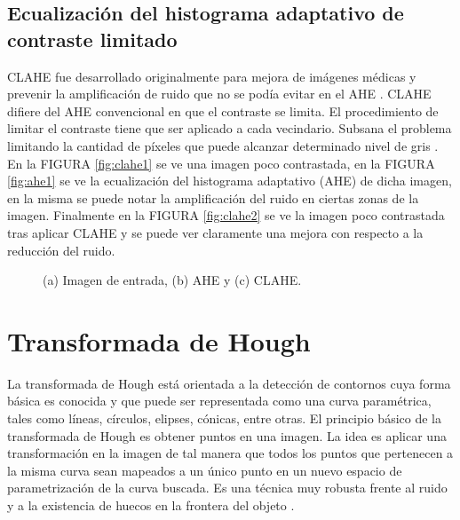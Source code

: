 \subsection{Ecualización del histograma adaptativo de contraste limitado}
CLAHE fue desarrollado originalmente para mejora de imágenes médicas y prevenir la amplificación de ruido que no se podía evitar en el AHE \cite{pizer1987adaptive}.
CLAHE difiere del AHE convencional en que el contraste se limita. El procedimiento de limitar el contraste tiene que ser aplicado a cada vecindario. Subsana el problema limitando la cantidad de píxeles que puede alcanzar determinado nivel de gris \cite{singh2011analysis}. En la FIGURA \ref{fig:clahe1} se ve una imagen poco contrastada, en la FIGURA \ref{fig:ahe1} se ve la ecualización del histograma adaptativo (AHE) de dicha imagen, en la misma se puede notar la amplificación del ruido en ciertas zonas de la imagen. Finalmente en la FIGURA \ref{fig:clahe2}  se ve la imagen poco contrastada tras aplicar CLAHE y se puede ver claramente una mejora con respecto a la reducción del ruido. 
  \begin{figure}[H]
	\centering
	\caption{(a) Imagen de entrada, (b) AHE y (c) CLAHE.}
	\label{fig:clahe}
\end{figure}
    \section{Transformada de Hough}
   La transformada de Hough \cite{ hough1962method} está orientada a la detección de contornos cuya forma básica es conocida y que puede ser representada como una curva paramétrica, tales como líneas, círculos, elipses, cónicas, entre otras. El principio básico de la transformada de Hough es obtener puntos en una imagen. La idea es aplicar una transformación en la imagen de tal manera que todos los puntos que pertenecen a la misma curva sean mapeados a un único punto en un nuevo espacio de parametrización de la curva buscada.
  Es una técnica muy robusta frente al ruido y a la existencia de huecos en la frontera del objeto \cite{platero2009apuntes}. 
  
